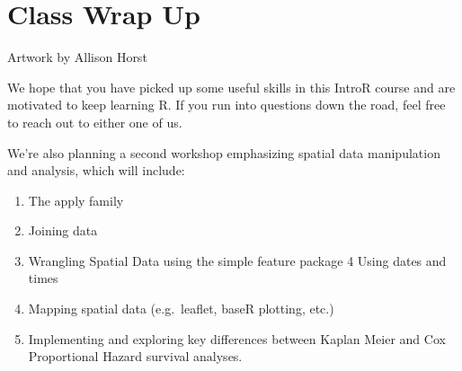 \documentclass[
]{book}
\providecommand{\tightlist}{%
  \setlength{\itemsep}{0pt}\setlength{\parskip}{0pt}}
\begin{document}
\chapter{Class Wrap Up}\label{class-wrap-up}

Artwork by Allison Horst

We hope that you have picked up some useful skills in this IntroR course and are motivated to keep learning R. If you run into questions down the road, feel free to reach out to either one of us.

We're also planning a second workshop emphasizing spatial data manipulation and analysis, which will include:

\begin{enumerate}
\def\labelenumi{\arabic{enumi}.}
\tightlist
\item
  The apply family
\item
  Joining data
\item
  Wrangling Spatial Data using the simple feature package
  4 Using dates and times
\item
  Mapping spatial data (e.g.~leaflet, baseR plotting, etc.)
\item
  Implementing and exploring key differences between Kaplan Meier and Cox Proportional Hazard survival analyses.
\end{enumerate}

  
\end{document}
